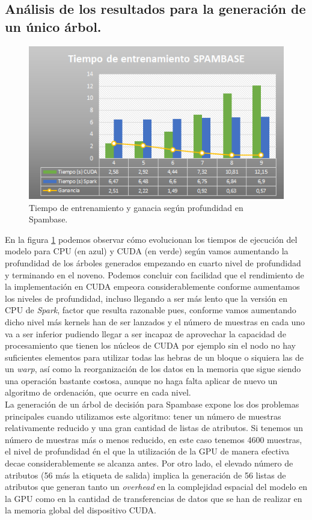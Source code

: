 \subsection{Análisis de los resultados para la generación de un único árbol.}
\begin{figure}[ht]
\centering
\includegraphics[scale=1.0]{imagenes/spambase_times.png}
\caption{Tiempo de entrenamiento y ganacia según profundidad en Spambase.}
\label{img:spambasetimes}
\end{figure}
En la figura \ref{img:spambasetimes} podemos observar cómo evolucionan los tiempos de ejecución del modelo para CPU (en azul) y CUDA (en verde) según vamos aumentando la profundidad de los árboles generados empezando en cuarto nivel de profundidad y terminando en el noveno. Podemos concluir con facilidad que el rendimiento de la implementación en CUDA empeora considerablemente conforme aumentamos los niveles de profundidad, incluso llegando a ser más lento que la versión en CPU de \textit{Spark}, factor que resulta razonable pues, conforme vamos aumentando dicho nivel más kernels han de ser lanzados y el número de muestras en cada uno va a ser inferior pudiendo llegar a ser incapaz de aprovechar la capacidad de procesamiento que tienen los núcleos de CUDA por ejemplo sin el nodo no hay suficientes elementos para utilizar todas las hebras de un bloque o siquiera las de un \textit{warp}, así como la reorganización de los datos en la memoria que sigue siendo una operación bastante costosa, aunque no haga falta aplicar de nuevo un algoritmo de ordenación, que ocurre en cada nivel. \\

La generación de un árbol de decisión para Spambase expone los dos problemas principales cuando utilizamos este algoritmo: tener un número de muestras relativamente reducido y una gran cantidad de listas de atributos. Si tenemos un número de muestras más o menos reducido, en este caso tenemos 4600 muestras, el nivel de profundidad én el que la utilización de la GPU de manera efectiva decae considerablemente se alcanza antes. Por otro lado, el elevado número de atributos (56 más la etiqueta de salida) implica la generación de 56 listas de atributos que generan tanto un \textit{overhead} en la complejidad espacial del modelo en la GPU como en la cantidad de transferencias de datos que se han de realizar en la memoria global del dispositivo CUDA. \\

